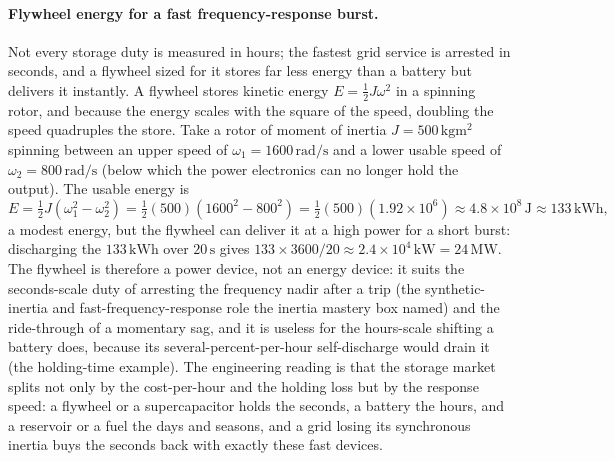 \paragraph{Flywheel energy for a fast frequency-response burst.} Not every
storage duty is measured in hours; the fastest grid service is arrested in
seconds, and a flywheel sized for it stores far less energy than a battery but
delivers it instantly. A flywheel stores kinetic energy $E = \tfrac12 J
\omega^2$ in a spinning rotor, and because the energy scales with the square of
the speed, doubling the speed quadruples the store. Take a rotor of moment of
inertia $J = 500\,\si{\kilogram\meter\squared}$ spinning between an upper speed
of $\omega_1 = 1600\,\si{\radian\per\second}$ and a lower usable speed of
$\omega_2 = 800\,\si{\radian\per\second}$ (below which the power electronics can
no longer hold the output). The usable energy is
\[
E = \tfrac12 J(\omega_1^2 - \omega_2^2)
= \tfrac12 (500)(1600^2 - 800^2)
= \tfrac12 (500)(1.92\times 10^6) \approx 4.8\times 10^8\,\si{\joule}
\approx 133\,\si{\kilo\watt\hour},
\]
a modest energy, but the flywheel can deliver it at a high power for a short
burst: discharging the $133\,\si{\kilo\watt\hour}$ over $20\,\si{\second}$
gives $133\times 3600/20 \approx 2.4\times 10^4\,\si{\kilo\watt} = 24\,\si{
\mega\watt}$. The flywheel is therefore a power device, not an energy device: it
suits the seconds-scale duty of arresting the frequency nadir after a trip (the
synthetic-inertia and fast-frequency-response role the inertia mastery box
named) and the ride-through of a momentary sag, and it is useless for the
hours-scale shifting a battery does, because its several-percent-per-hour
self-discharge would drain it (the holding-time example). The engineering
reading is that the storage market splits not only by the cost-per-hour and the
holding loss but by the response speed: a flywheel or a supercapacitor holds
the seconds, a battery the hours, and a reservoir or a fuel the days and
seasons, and a grid losing its synchronous inertia buys the seconds back with
exactly these fast devices.

